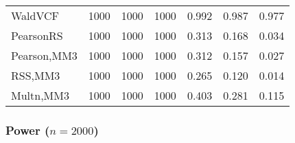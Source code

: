 \documentclass[
]{article}
\begin{document}
\begin{table}[H]
{\begin{tabular}[t]{lrrrrrr}
\hspace{1em}WaldVCF & 1000 & 1000 & 1000 & 0.992 & 0.987 & 0.977\\
\hspace{1em}PearsonRS & 1000 & 1000 & 1000 & 0.313 & 0.168 & 0.034\\
\hspace{1em}Pearson,MM3 & 1000 & 1000 & 1000 & 0.312 & 0.157 & 0.027\\
\hspace{1em}RSS,MM3 & 1000 & 1000 & 1000 & 0.265 & 0.120 & 0.014\\
\hspace{1em}Multn,MM3 & 1000 & 1000 & 1000 & 0.403 & 0.281 & 0.115\\
\bottomrule
\end{tabular}}
\endgroup{}
\end{table}

\hypertarget{power-n2000-3}{%
\subsubsection{\texorpdfstring{Power
(\(n=2000\))}{Power (n=2000)}}\label{power-n2000-3}}
\end{document}
